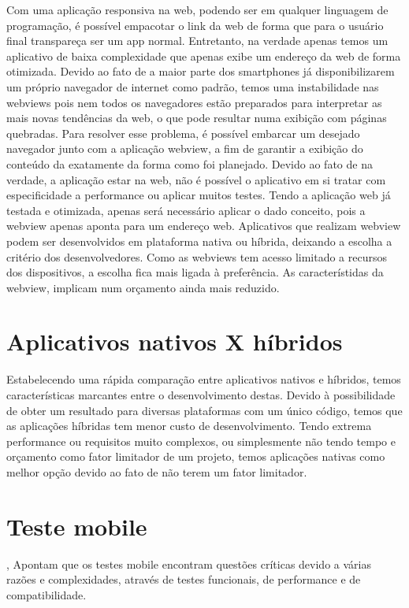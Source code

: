 Com uma aplicação responsiva na web, podendo ser em qualquer linguagem de programação, é possível empacotar o link da web de forma que para o usuário final transpareça ser um app normal. Entretanto, na verdade apenas temos um aplicativo de baixa complexidade que apenas exibe um endereço da web de forma otimizada. Devido ao fato de a maior parte dos smartphones já disponibilizarem um próprio navegador de internet como padrão, temos uma instabilidade nas webviews pois nem todos os navegadores estão preparados para interpretar as mais novas tendências da web, o que pode resultar numa exibição com páginas quebradas. Para resolver esse problema, é possível embarcar um desejado navegador junto com a aplicação webview, a fim de garantir a exibição do conteúdo da exatamente da forma como foi planejado. Devido ao fato de na verdade, a aplicação estar na web, não é possível o aplicativo em si tratar com especificidade a performance ou aplicar muitos testes. Tendo a aplicação web já testada e otimizada, apenas será necessário aplicar o dado conceito, pois a webview apenas aponta para um endereço web. Aplicativos que realizam webview podem ser desenvolvidos em plataforma nativa ou híbrida, deixando a escolha  a critério dos desenvolvedores. Como as webviews tem acesso limitado a recursos dos dispositivos, a escolha fica mais ligada à preferência. As característidas da webview, implicam num orçamento ainda mais reduzido.


\section{Aplicativos nativos X híbridos}


Estabelecendo uma rápida comparação entre aplicativos nativos e híbridos, temos  características marcantes entre o desenvolvimento destas. Devido à possibilidade de obter um resultado para diversas plataformas com um único código, temos que as aplicações híbridas tem menor custo de desenvolvimento. Tendo extrema performance ou requisitos muito complexos, ou simplesmente não tendo tempo e orçamento como fator limitador de um projeto, temos aplicações nativas como melhor opção devido ao fato de não terem um fator limitador.


\section{Teste mobile}


\cite{Prathibhan-2014}, Apontam que os testes mobile encontram questões críticas devido a várias razões e complexidades, através de testes funcionais, de performance e de compatibilidade.


